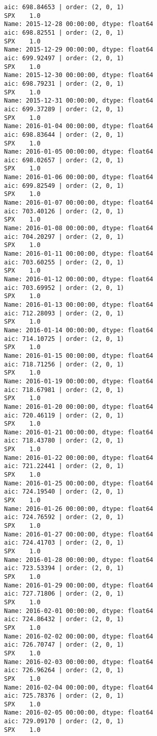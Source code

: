 \documentclass[11pt]{article}
\begin{document}
    \begin{Verbatim}[commandchars=\\\{\}]
aic: 698.84653 | order: (2, 0, 1)
SPX    1.0
Name: 2015-12-28 00:00:00, dtype: float64
aic: 698.82551 | order: (2, 0, 1)
SPX    1.0
Name: 2015-12-29 00:00:00, dtype: float64
aic: 699.92497 | order: (2, 0, 1)
SPX    1.0
Name: 2015-12-30 00:00:00, dtype: float64
aic: 698.79231 | order: (2, 0, 1)
SPX    1.0
Name: 2015-12-31 00:00:00, dtype: float64
aic: 699.37289 | order: (2, 0, 1)
SPX    1.0
Name: 2016-01-04 00:00:00, dtype: float64
aic: 698.83644 | order: (2, 0, 1)
SPX    1.0
Name: 2016-01-05 00:00:00, dtype: float64
aic: 698.02657 | order: (2, 0, 1)
SPX    1.0
Name: 2016-01-06 00:00:00, dtype: float64
aic: 699.82549 | order: (2, 0, 1)
SPX    1.0
Name: 2016-01-07 00:00:00, dtype: float64
aic: 703.40126 | order: (2, 0, 1)
SPX    1.0
Name: 2016-01-08 00:00:00, dtype: float64
aic: 704.20297 | order: (2, 0, 1)
SPX    1.0
Name: 2016-01-11 00:00:00, dtype: float64
aic: 703.60255 | order: (2, 0, 1)
SPX    1.0
Name: 2016-01-12 00:00:00, dtype: float64
aic: 703.69952 | order: (2, 0, 1)
SPX    1.0
Name: 2016-01-13 00:00:00, dtype: float64
aic: 712.28093 | order: (2, 0, 1)
SPX    1.0
Name: 2016-01-14 00:00:00, dtype: float64
aic: 714.10725 | order: (2, 0, 1)
SPX    1.0
Name: 2016-01-15 00:00:00, dtype: float64
aic: 718.71256 | order: (2, 0, 1)
SPX    1.0
Name: 2016-01-19 00:00:00, dtype: float64
aic: 718.67981 | order: (2, 0, 1)
SPX    1.0
Name: 2016-01-20 00:00:00, dtype: float64
aic: 720.46119 | order: (2, 0, 1)
SPX    1.0
Name: 2016-01-21 00:00:00, dtype: float64
aic: 718.43780 | order: (2, 0, 1)
SPX    1.0
Name: 2016-01-22 00:00:00, dtype: float64
aic: 721.22441 | order: (2, 0, 1)
SPX    1.0
Name: 2016-01-25 00:00:00, dtype: float64
aic: 724.19540 | order: (2, 0, 1)
SPX    1.0
Name: 2016-01-26 00:00:00, dtype: float64
aic: 724.76592 | order: (2, 0, 1)
SPX    1.0
Name: 2016-01-27 00:00:00, dtype: float64
aic: 724.41703 | order: (2, 0, 1)
SPX    1.0
Name: 2016-01-28 00:00:00, dtype: float64
aic: 723.53394 | order: (2, 0, 1)
SPX    1.0
Name: 2016-01-29 00:00:00, dtype: float64
aic: 727.71806 | order: (2, 0, 1)
SPX    1.0
Name: 2016-02-01 00:00:00, dtype: float64
aic: 724.86432 | order: (2, 0, 1)
SPX    1.0
Name: 2016-02-02 00:00:00, dtype: float64
aic: 726.70747 | order: (2, 0, 1)
SPX    1.0
Name: 2016-02-03 00:00:00, dtype: float64
aic: 726.96264 | order: (2, 0, 1)
SPX    1.0
Name: 2016-02-04 00:00:00, dtype: float64
aic: 725.78376 | order: (2, 0, 1)
SPX    1.0
Name: 2016-02-05 00:00:00, dtype: float64
aic: 729.09170 | order: (2, 0, 1)
SPX    1.0

\end{Verbatim}
\end{document}
